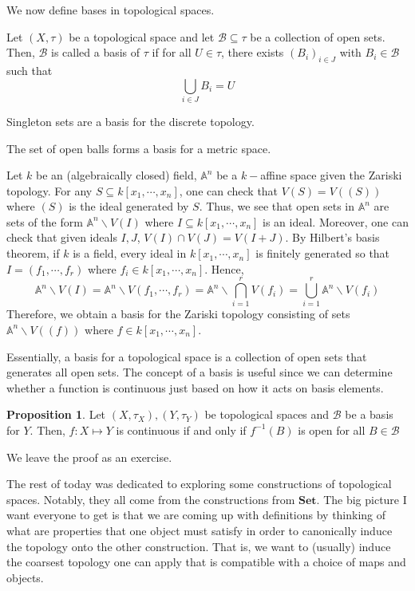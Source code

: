 \documentclass[12pt,reqno]{amsart}
\numberwithin{theorem}{section}
\theoremstyle{definition}
\theoremstyle{remark}
\numberwithin{equation}{section}
\theoremstyle{definition}
\newtheorem{prop}[theorem]{Proposition}
\begin{document}
We now define bases in topological spaces.
\begin{definition}
    Let $(X,\tau)$ be a topological space and let $\mathcal{B} \subseteq \tau$ be a collection of open sets. Then, $\mathcal{B}$ is called a basis of $\tau$ if for all $U \in \tau$, there exists $(B_i)_{i\in J}$ with $B_i \in \mathcal{B}$ such that
    $$\bigcup_{i\in J} B_i = U$$
\end{definition}
\begin{example}
    Singleton sets are a basis for the discrete topology.
\end{example}
\begin{example}
    The set of open balls forms a basis for a metric space.
\end{example}
\begin{example}
    Let $k$ be an (algebraically closed) field, $\mathbb A^n$ be a $k-$affine space given the Zariski topology. For any $S \subseteq k[x_1,\cdots,x_n]$, one can check that $V(S) = V((S))$ where $(S)$ is the ideal generated by $S$. Thus, we see that open sets in $\mathbb A^n$ are sets of the form $\mathbb A^n\backslash V(I)$ where $I\subseteq k[x_1,\cdots,x_n]$ is an ideal. Moreover, one can check that given ideals $I,J$, $V(I) \cap V(J) = V(I+J)$. By Hilbert's basis theorem, if $k$ is a field, every ideal in $k[x_1,\cdots,x_n]$ is finitely generated so that $I = (f_1,\cdots,f_r)$ where $f_i \in k[x_1,\cdots,x_n]$. Hence, $$\mathbb A^n \backslash V(I) = \mathbb A^n \backslash V(f_1,\cdots,f_r)  =\mathbb A^n \backslash \bigcap_{i=1}^r V(f_i) = \bigcup_{i=1}^r \mathbb A^n \backslash V(f_i)$$
    Therefore, we obtain a basis for the Zariski topology consisting of sets $\mathbb A^n\backslash V((f))$ where $f \in k[x_1,\cdots,x_n]$.
\end{example}
 Essentially, a basis for a topological space is a collection of open sets that generates all open sets. The concept of a basis is useful since we can determine whether a function is continuous just based on how it acts on basis elements.
\begin{prop}
    Let $(X,\tau_X), (Y,\tau_Y)$ be topological spaces and $\mathcal{B}$ be a basis for $Y$. Then, $f:X\mapsto Y$ is continuous if and only if $f^{-1}(B)$ is open for all $B \in \mathcal{B}$
\end{prop}
We leave the proof as an exercise. 

The rest of today was dedicated to exploring some constructions of topological spaces. Notably, they all come from the constructions from $\mathbf{Set}$. The big picture I want everyone to get is that we are coming up with definitions by thinking of what are properties that one object must satisfy in order to canonically induce the topology onto the other construction. That is, we want to (usually) induce the coarsest topology one can apply that is compatible with a choice of maps and objects.
\end{document}
